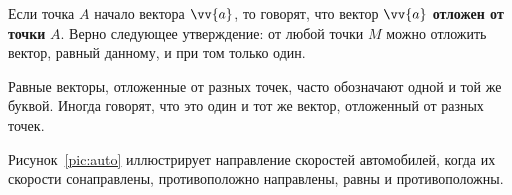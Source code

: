 \clearpage

Если точка $A$ \bdash начало вектора $\vv{a}$, то говорят, что вектор $\vv{a}$
\textbf{отложен от точки} $A$. Верно следующее утверждение: от любой точки $M$ можно отложить
вектор, равный данному, и при том только один.

Равные векторы, отложенные от разных точек, часто обозначают одной и той же буквой.
Иногда говорят, что это один и тот же вектор, отложенный от разных точек.

%    

Рисунок~\ref{pic:auto} иллюстрирует направление скоростей автомобилей,
когда их скорости сонаправлены, противоположно направлены, равны и противоположны.

